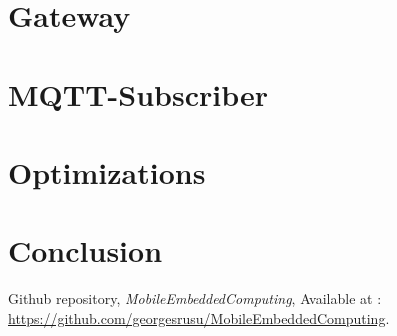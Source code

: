 \documentclass[a4paper,10pt]{article}
\begin{document}
\section{Gateway}
\label{gateway}
\section{MQTT-Subscriber}
\label{subscriber}
\section{Optimizations}
\label{opti}

\section{Conclusion}

\begin{thebibliography}{9}

Github repository,
\textit{MobileEmbeddedComputing}, Available at :
\url{https://github.com/georgesrusu/MobileEmbeddedComputing}.


\end{thebibliography}
\end{document}
